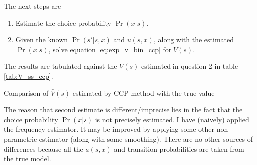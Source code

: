 \documentclass[12pt]{article}[margin=1in]
\begin{document}
The next steps are
\begin{enumerate}
    \item Estimate the choice probability ${\Pr}(x|s)$.
    \item Given the known $\Pr(s'|s,x)$ and $u(s,x)$, along with the estimated
          $\Pr(x|s)$, solve equation \ref{eq:exp_v_bin_ccp} for $\bar{V}(s)$.
\end{enumerate}
The results are tabulated against the $\bar{V}(s)$ estimated in question 2 in table \ref{tab:V_ss_ccp}.
\newpage
\begin{table}
    \centering
    
    \caption{Comparison of $\bar{V}(s)$ estimated by CCP method with the true value}
    \label{tab:V_ss_ccp}
\end{table}
The reason that second estimate is different/imprecise lies in the fact that the choice probability $\Pr(x|s)$ is not precisely estimated. I have (naively) applied the frequency estimator. It may be improved by applying some other non-parametric estimator (along with some smoothing). There are no other sources of differences because all the $u(s,x)$ and transition probabilities are taken from the true model.
\end{document}
